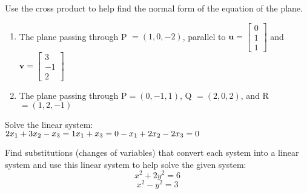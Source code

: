 \documentclass[11pt,letterpaper,boxed]{hmcpset}
\begin{document}
\begin{problem}[\#4] 
Use the cross product to help find the normal form of the equation of the plane.
\begin{enumerate}
\item The plane passing through P $=(1,0,-2)$, parallel to $\textbf{u} = \begin{bmatrix} 0 \\ 1 \\ 1 \end{bmatrix}$ and $\textbf{v} = \begin{bmatrix} 3 \\ -1 \\ 2 \end{bmatrix}$
\item The plane passing through P$= (0,-1,1)$, Q $= (2,0,2)$, and R $= (1,2,-1)$
\end{enumerate}
\end{problem}



\pagebreak


\begin{problem}[\#34] 
Solve the linear system:\\
$2x_1 + 3x_2 - x_3 = 1\\
x_1 + x_3 = 0\\
-x_1+2x_2-2x_3=0$
\end{problem}



\pagebreak


\begin{problem}[\#42] 
Find substitutions (changes of variables) that convert each system into a linear system and use this linear system to help solve the given system:\\
\[
x^2 + 2y^2 = 6
\]
\[
x^2 - y^2 = 3
\]
\end{problem}



\pagebreak

\end{document}

